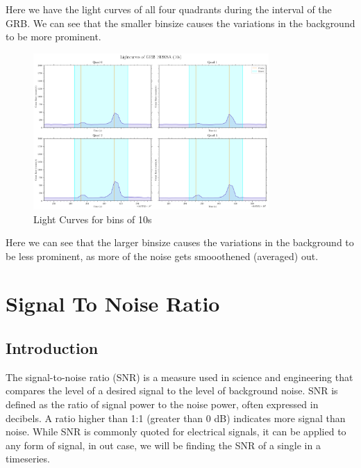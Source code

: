 \documentclass[11pt]{book} %
\begin{document}
Here we have the light curves of all four quadrants during the interval of the GRB. We can see that the smaller binsize causes the variations in the background to be more prominent. 

\begin{figure}[H]
    \centering
    \includegraphics[width=0.8\textwidth]{Pictures/allquads10s.png}
    \caption{Light Curves for bins of 10s}
\end{figure}

Here we can see that the larger binsize causes the variations in the background to be less prominent, as more of the noise gets smooothened (averaged) out.


\chapter{Signal To Noise Ratio}

\section{Introduction}

The signal-to-noise ratio (SNR) is a measure used in science and engineering that compares the level of a desired signal to the level of background noise. SNR is defined as the ratio of signal power to the noise power, often expressed in decibels. A ratio higher than 1:1 (greater than 0 dB) indicates more signal than noise. While SNR is commonly quoted for electrical signals, it can be applied to any form of signal, in out case, we will be finding the SNR of a single in a timeseries. 

%
\end{document}
